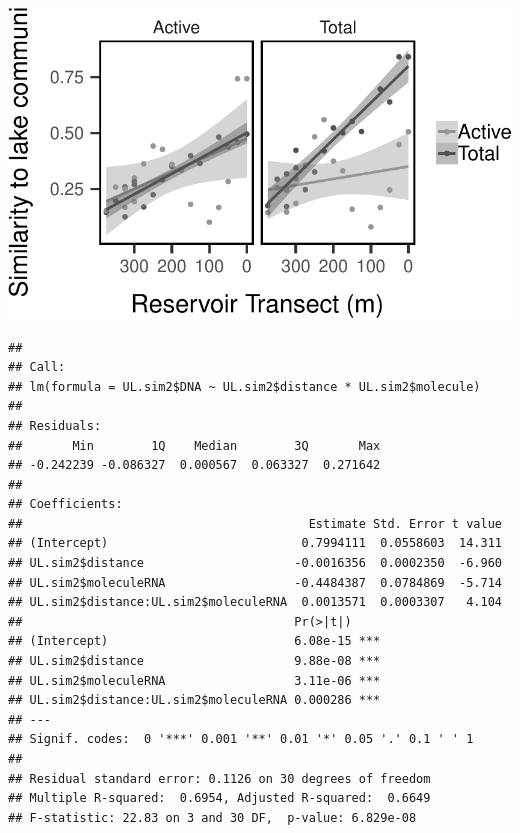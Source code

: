 \documentclass[]{article}
\newenvironment{Shaded}{\begin{snugshade}}{\end{snugshade}}
\newcommand{\KeywordTok}[1]{\textcolor[rgb]{0.13,0.29,0.53}{\textbf{#1}}}
\newcommand{\StringTok}[1]{\textcolor[rgb]{0.31,0.60,0.02}{#1}}
\newcommand{\CommentTok}[1]{\textcolor[rgb]{0.56,0.35,0.01}{\textit{#1}}}
\newcommand{\OperatorTok}[1]{\textcolor[rgb]{0.81,0.36,0.00}{\textbf{#1}}}
\newcommand{\NormalTok}[1]{#1}
\begin{document}
\begin{center}\includegraphics[width=0.7\linewidth]{ReservoirGradient_files/figure-latex/plot_similarity_to_lake-1} \end{center}

\begin{Shaded}
\end{Shaded}

\begin{verbatim}
## 
## Call:
## lm(formula = UL.sim2$DNA ~ UL.sim2$distance * UL.sim2$molecule)
## 
## Residuals:
##       Min        1Q    Median        3Q       Max 
## -0.242239 -0.086327  0.000567  0.063327  0.271642 
## 
## Coefficients:
##                                        Estimate Std. Error t value
## (Intercept)                           0.7994111  0.0558603  14.311
## UL.sim2$distance                     -0.0016356  0.0002350  -6.960
## UL.sim2$moleculeRNA                  -0.4484387  0.0784869  -5.714
## UL.sim2$distance:UL.sim2$moleculeRNA  0.0013571  0.0003307   4.104
##                                      Pr(>|t|)    
## (Intercept)                          6.08e-15 ***
## UL.sim2$distance                     9.88e-08 ***
## UL.sim2$moleculeRNA                  3.11e-06 ***
## UL.sim2$distance:UL.sim2$moleculeRNA 0.000286 ***
## ---
## Signif. codes:  0 '***' 0.001 '**' 0.01 '*' 0.05 '.' 0.1 ' ' 1
## 
## Residual standard error: 0.1126 on 30 degrees of freedom
## Multiple R-squared:  0.6954, Adjusted R-squared:  0.6649 
## F-statistic: 22.83 on 3 and 30 DF,  p-value: 6.829e-08
\end{verbatim}
\end{document}
